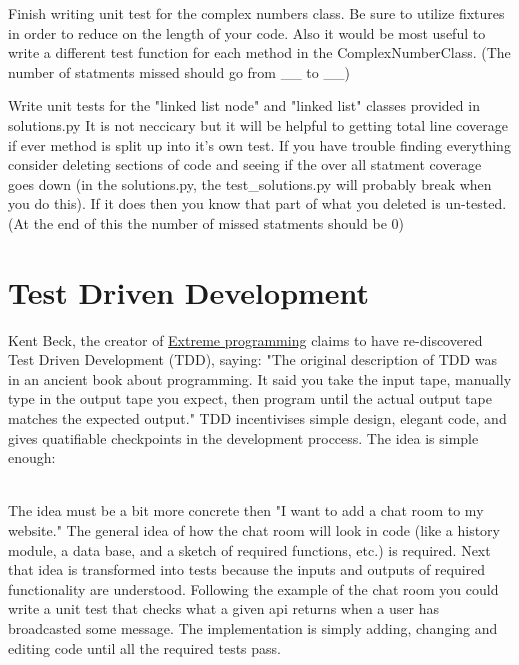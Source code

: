 \begin{problem}
Finish writing unit test for the complex numbers class. Be sure to utilize fixtures in order to reduce on the length of your code.
Also it would be most useful to write a different test function for each method in the ComplexNumberClass.
(The number of statments missed should go from \_\_ to \_\_)
\end{problem}

\begin{problem}
Write unit tests for the "linked list node" and "linked list" classes provided in solutions.py It is not neccicary but it will be helpful to getting total line coverage if ever method is split up into it's own test.
If you have trouble finding everything consider deleting sections of code and seeing if the over all statment coverage goes down (in the solutions.py, the test\_solutions.py will probably break when you do this).
If it does then you know that part of what you deleted is un-tested.
(At the end of this the number of missed statments should be 0)
\end{problem}

\section*{Test Driven Development}

Kent Beck, the creator of \href{https://en.wikipedia.org/wiki/Extreme_programming}{Extreme programming} claims to have re-discovered  Test Driven Development (TDD), saying:
"The original description of TDD was in an ancient book about programming. It said you take the input tape, manually type in the output tape you expect, then program until the actual output tape matches the expected output."
TDD incentivises simple design, elegant code, and gives quatifiable checkpoints in the development proccess.
The idea is simple enough:
\\
The idea must be a bit more concrete then "I want to add a chat room to my website." The general idea of how the chat room will look in code (like a history module, a data base, and a sketch of required functions, etc.) is required.
Next that idea is transformed into tests because the inputs and outputs of required functionality are understood.
Following the example of the chat room you could write a unit test that checks what a given api returns when a user has broadcasted some message.
The implementation is simply adding, changing and editing code until all the required tests pass.

